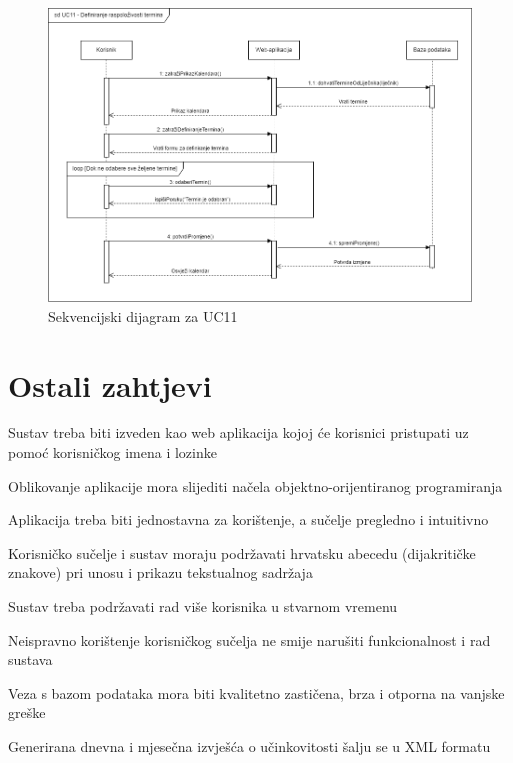 				\begin{figure}[H]
			            \includegraphics[width=\textwidth]{slike/sd_uc11.png} %
			            \caption{Sekvencijski dijagram za UC11}
			            \label{fig:sd3} %
		        \end{figure}
		        
		        \eject

		\section{Ostali zahtjevi}
			
			 \begin{packed_item}
			     \item Sustav treba biti izveden kao web aplikacija kojoj će korisnici pristupati uz pomoć korisničkog imena i lozinke
			     \item Oblikovanje aplikacije mora slijediti načela objektno-orijentiranog programiranja
			     \item Aplikacija treba biti jednostavna za korištenje, a sučelje pregledno i intuitivno
			     \item  Korisničko sučelje i sustav moraju podržavati hrvatsku abecedu (dijakritičke znakove) pri unosu i prikazu tekstualnog sadržaja
			     \item Sustav treba podržavati rad više korisnika u stvarnom vremenu
			     \item Neispravno korištenje korisničkog sučelja ne smije narušiti funkcionalnost i rad sustava
			     \item Veza s bazom podataka mora biti kvalitetno zastičena, brza i otporna na vanjske greške
			     \item Generirana dnevna i mjesečna izvješća o učinkovitosti šalju se u XML formatu
			     
			 \end{packed_item}
			 
			 
			 
	